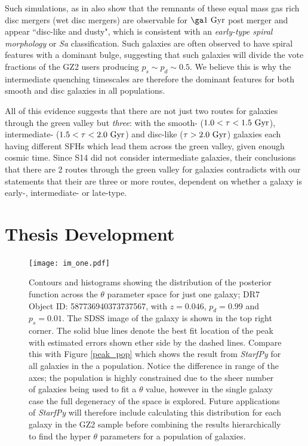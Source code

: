 \documentclass{mn2e}
\begin{document}
Such simulations, as in \citet{Lotz08} also show that the remnants of these equal mass gas rich disc mergers (wet disc mergers) are observable for $\ga1~\rm{Gyr}$ post merger and appear ``disc-like and dusty", which is consistent with an \emph{early-type spiral morphology} or \emph{Sa} classification.  Such galaxies are often observed to have spiral features with a dominant bulge, suggesting that such galaxies will divide the vote fractions of the GZ2 users producing $p_s \sim p_d \sim 0.5$. We believe this is why the intermediate quenching timescales are therefore the dominant features for both smooth and disc galaxies in all populations.

All of this evidence suggests that there are not just two routes for galaxies through the green valley but \emph{three}: with the smooth- ($1.0 < \tau < 1.5 ~\rm{Gyr}$), intermediate- ($1.5 < \tau < 2.0~\rm{Gyr}$) and disc-like ($\tau > 2.0~\rm{Gyr}$) galaxies each having different SFHs which lead them across the green valley, given enough cosmic time. Since S14 did not consider intermediate galaxies, their conclusions that there are 2 routes through the green valley for galaxies contradicts with our statements that their are three or more routes, dependent on whether a galaxy is early-, intermediate- or late-type. 



\section{Thesis Development}\label{thesis}

\begin{figure}
\texttt{[image: im\_one.pdf]}
\caption{Contours and histograms showing the distribution of the posterior function across the $\theta$ parameter space for just one galaxy; DR7 Object ID: 587736940373737567, with $z=0.046$, $p_{d} = 0.99$ and $p_{s} = 0.01$. The SDSS image of the galaxy is shown in the top right corner. The solid blue lines denote the best fit location of the peak with estimated errors shown ether side by the dashed lines. Compare this with Figure \ref{peak_pop} which shows the result from \emph{StarfPy} for all galaxies in the a population. Notice the difference in range of the axes; the population is highly constrained due to the sheer number of galaxies being used to fit a $\theta$ value, however in the single galaxy case the full degeneracy of the space is explored. Future applications of \emph{StarfPy} will therefore include calculating this distribution for each galaxy in the GZ2 sample before combining the results hierarchically to find the hyper $\theta$ parameters for a population of galaxies.}
\label{im_one}
\end{figure}
\end{document}
